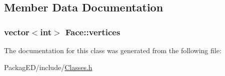 \subsection{Member Data Documentation}
\subsubsection[{\texorpdfstring{vertices}{vertices}}]{\setlength{\rightskip}{0pt plus 5cm}vector$<$int$>$ Face\+::vertices}\hypertarget{class_face_a143cb19243f02eae4ba5784c0d72e47b}{}\label{class_face_a143cb19243f02eae4ba5784c0d72e47b}


The documentation for this class was generated from the following file\+:\begin{DoxyCompactItemize}
\item 
Packag\+E\+D/include/\hyperlink{_classes_8h}{Classes.\+h}\end{DoxyCompactItemize}
